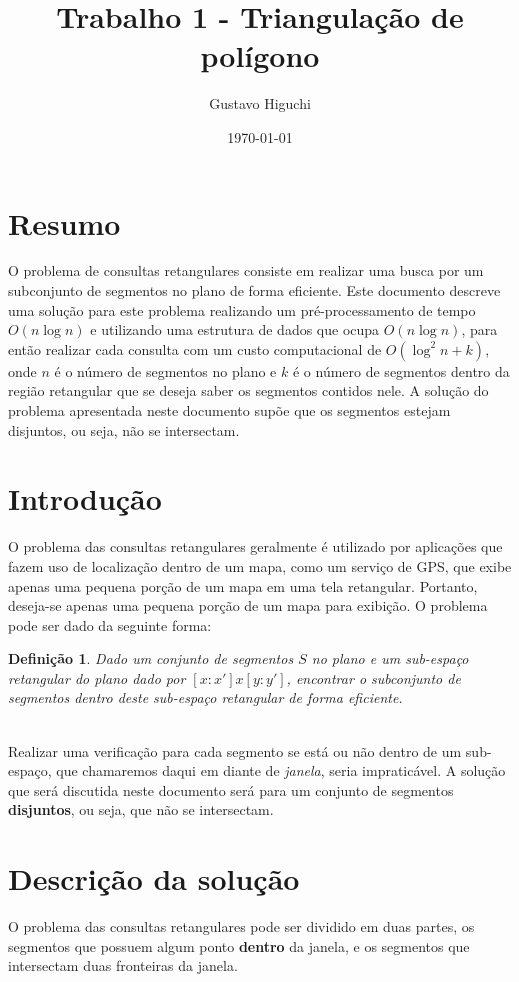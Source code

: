 \documentclass{article}
\title{Trabalho 1 - Triangulação de polígono}
\author{Gustavo Higuchi}
\date{\today}
\newtheorem{definicao}{Definição}
\theoremstyle{definition}
\begin{document}
\maketitle
\newpage
\tableofcontents
\newpage
\section{Resumo}
\hspace*{15pt} O problema de consultas retangulares consiste em realizar
uma busca por um subconjunto de segmentos no plano de forma eficiente. 
Este documento descreve uma solução para este problema realizando um 
pré-processamento de tempo $O(n\log n)$ e utilizando uma estrutura de
dados que ocupa $O(n\log n)$, para então realizar cada consulta com um 
custo computacional de $O(\log^2 n + k)$, onde $n$ é o número de segmentos
no plano e $k$ é o número de segmentos dentro da região retangular que 
se deseja saber os segmentos contidos nele. A solução do problema apresentada
neste documento supõe que os segmentos estejam disjuntos, ou seja, não
se intersectam.

\section{Introdução}
\hspace*{15pt} O problema das consultas retangulares geralmente é utilizado
por aplicações que fazem uso de localização dentro de um mapa, como
um serviço de GPS, que exibe apenas uma pequena porção de um mapa em uma
tela retangular. Portanto, deseja-se apenas uma pequena porção de um mapa
para exibição. O problema pode ser dado da seguinte forma:\\
\begin{definicao}
    Dado um conjunto de segmentos $S$ no plano e um sub-espaço retangular 
    do plano dado por $[x:x']x[y:y']$, encontrar o subconjunto de segmentos
    dentro deste sub-espaço retangular de forma eficiente.
\end{definicao}
\\
\hspace*{15pt}Realizar uma verificação para cada segmento se está ou não 
dentro de um sub-espaço, que chamaremos daqui em diante de \textit{janela}, 
seria impraticável. A solução que será discutida neste documento será para 
um conjunto de segmentos \textbf{disjuntos}, ou seja, que não se intersectam. 


\section{Descrição da solução}
\hspace*{15pt} O problema das consultas retangulares pode ser dividido em duas
partes, os segmentos que possuem algum ponto \textbf{dentro} da janela, e os
segmentos que intersectam duas fronteiras da janela.\\
\\
\end{document}
